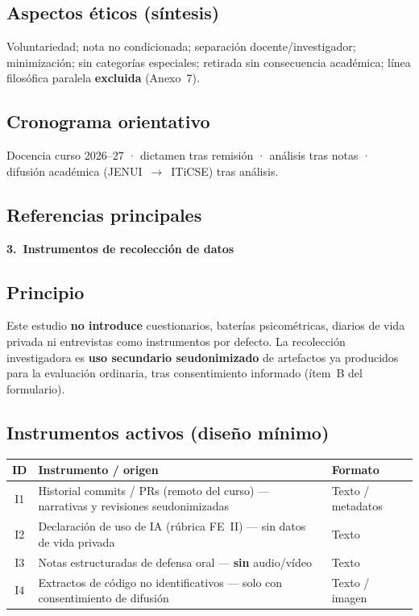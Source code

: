 \documentclass[11pt,a4paper]{scrartcl}
\newcommand{\AnnexTitle}[1]{%
  \clearpage
  \LogoRow
  \begin{center}{\Large\sffamily\bfseries #1}\end{center}
  \vspace{0.4em}
  \noindent{\color{rulegray}\hrule height 0.4pt}
  \vspace{0.5em}
}
\begin{document}
\subsection*{Aspectos éticos (síntesis)}
Voluntariedad; nota no condicionada; separación docente/investigador; minimización;
sin categorías especiales; retirada sin consecuencia académica; línea filosófica
paralela \textbf{excluida} (Anexo~7).

\subsection*{Cronograma orientativo}
Docencia curso 2026--27 · dictamen tras remisión · análisis tras notas · difusión
académica (JENUI~$\rightarrow$~ITiCSE) tras análisis.

\subsection*{Referencias principales}
\ChicagoMethodsRefs

\AnnexTitle{3.\ Instrumentos de recolección de datos}

\subsection*{Principio}
Este estudio \textbf{no introduce} cuestionarios, baterías psicométricas, diarios
de vida privada ni entrevistas como instrumentos por defecto. La recolección
investigadora es \textbf{uso secundario seudonimizado} de artefactos ya producidos
para la evaluación ordinaria, tras consentimiento informado (ítem~B del formulario).

\subsection*{Instrumentos activos (diseño mínimo)}
\renewcommand{\arraystretch}{1.25}
\begin{tabularx}{\textwidth}{@{}c>{\raggedright\arraybackslash}X>{\raggedright\arraybackslash}p{3.2cm}@{}}
  \toprule
  \textbf{ID} & \textbf{Instrumento / origen} & \textbf{Formato} \\
  \midrule
  I1 & Historial commits / PRs (remoto del curso) --- narrativas y revisiones seudonimizadas & Texto / metadatos \\
  I2 & Declaración de uso de IA (rúbrica FE~II) --- sin datos de vida privada & Texto \\
  I3 & Notas estructuradas de defensa oral --- \textbf{sin} audio/vídeo & Texto \\
  I4 & Extractos de código no identificativos --- solo con consentimiento de difusión & Texto / imagen \\
  \bottomrule
\end{tabularx}
\end{document}
